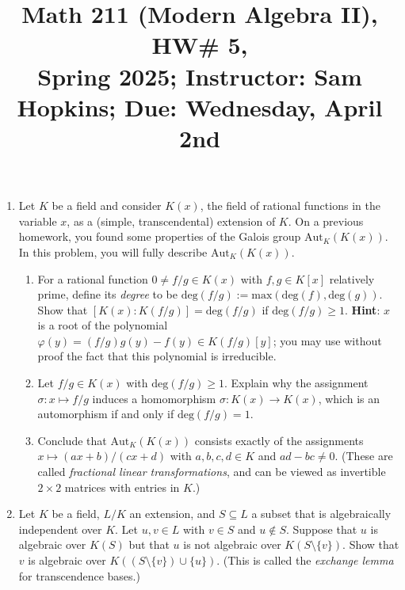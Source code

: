\documentclass[11pt]{article}
\title{Math 211 (Modern Algebra II), HW\# 5, \\ {\normalsize Spring 2025; Instructor: Sam Hopkins; Due: Wednesday, April 2nd}}
\date{}
\begin{document}
\maketitle

\thispagestyle{empty}

\vspace{-1cm}

\begin{enumerate}

\item Let $K$ be a field and consider $K(x)$, the field of rational functions in the variable $x$, as a (simple, transcendental) extension of $K$. On a previous homework, you found some properties of the Galois group $\mathrm{Aut}_K(K(x))$. In this problem, you will fully describe $\mathrm{Aut}_K(K(x))$.
\begin{enumerate}
    \item For a rational function $0 \neq f/g \in K(x)$ with $f,g \in K[x]$ relatively prime, define its \emph{degree} to be $\mathrm{deg}(f/g) := \mathrm{max}(\mathrm{deg}(f),\mathrm{deg}(g))$. Show that $[K(x) : K(f/g)] = \mathrm{deg}(f/g)$ if $\mathrm{deg}(f/g) \geq 1$. {\bf Hint}: $x$ is a root of the polynomial $\varphi(y) = (f/g)g(y)-f(y) \in K(f/g)[y]$; you may use without proof the fact that this polynomial is irreducible.
    \item Let $f/g \in K(x)$ with $\mathrm{deg}(f/g) \geq 1$. Explain why the assignment $\sigma\colon x \mapsto f/g$ induces a homomorphism $\sigma \colon K(x) \to K(x)$, which is an automorphism if and only if $\mathrm{deg}(f/g)=1$.
    \item Conclude that $\mathrm{Aut}_K(K(x))$ consists exactly of the assignments $x \mapsto (ax+b)/(cx+d)$ with $a,b,c,d \in K$ and $ad - bc \neq 0$. (These are called \emph{fractional linear transformations}, and can be viewed as invertible $2\times 2$ matrices with entries in $K$.)
\end{enumerate}

\item Let $K$ be a field, $L/K$ an extension, and $S \subseteq L$ a subset that is algebraically independent over $K$. Let $u, v \in L$ with $v \in S$ and $u \notin S$. Suppose that $u$ is algebraic over $K(S)$ but that $u$ is not algebraic over $K(S \setminus \{v\})$. Show that $v$ is algebraic over $K((S \setminus \{v\}) \cup \{u\})$. (This is called the \emph{exchange lemma} for transcendence bases.)


\end{enumerate}
\end{document}
